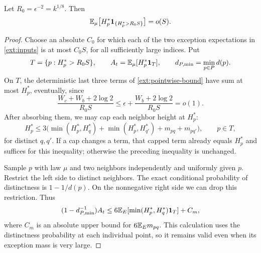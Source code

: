 \begin{lemma}\label{ext:tail}
Let \(R_0=\epsilon^{-2}=k^{1/8}\).  Then
\begin{equation}\label{ext:tail-bound}
 \mathbb E_\mu\bigl[H_p^*\mathbf1_{\{H_p^*>R_0S\}}\bigr]=o(S).
\end{equation}
\end{lemma}

\begin{proof}
Choose an absolute \(C_0\) for which each of the two exception expectations
in \eqref{ext:inputs} is at most \(C_0S\), for all sufficiently large
indices.  Put
\[
 T=\{p:H_p^*>R_0S\},\qquad
 A_t=\mathbb E_\mu[H_p^*\mathbf1_T],\qquad
 d_{P,\min}=\min_{p\in P}d(p).
\]
On \(T\), the deterministic last three terms of
\eqref{ext:pointwise-bound} have sum at most \(H_p^*\), eventually, since
\[
 \frac{W_c+W_b+2\log2}{R_0S}
 \le\epsilon+\frac{W_b+2\log2}{R_0S}=o(1).
\]
After absorbing them, we may cap each neighbor height at \(H_p^*\):
\begin{equation}\label{ext:capped-pointwise}
 H_p^*\le3\bigl(\min(H_p^*,H_q^*)+\min(H_p^*,H_{q'}^*)
                       +m_{pq}+m_{pq'}\bigr),\qquad p\in T,
\end{equation}
for distinct \(q,q'\).  If a cap changes a term, that capped term already
equals \(H_p^*\) and suffices for this inequality; otherwise the preceding
inequality is unchanged.

Sample \(p\) with law \(\mu\) and two neighbors independently and uniformly
given \(p\).  Restrict the left side to distinct neighbors.  The exact
conditional probability of distinctness is \(1-1/d(p)\).  On the
nonnegative right side we can drop this restriction.  Thus
\begin{equation}\label{ext:tail-average}
 (1-d_{P,\min}^{-1})A_t
 \le 6\mathbb E_E[\min(H_p^*,H_q^*)\mathbf1_T]+C_m,
\end{equation}
where \(C_m\) is an absolute upper bound for \(6\mathbb E_E m_{pq}\).
This calculation uses the distinctness probability at each individual
point, so it remains valid even when its exception mass is very large.


\end{proof}
